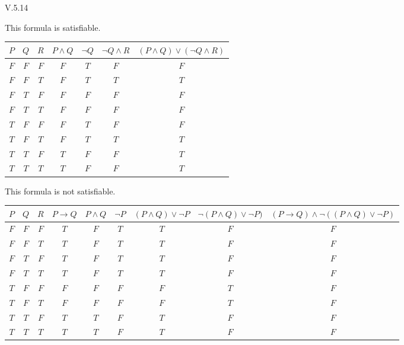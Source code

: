 \begin{ans}{V.5.14}
\begin{exparts}
\item This formula is satisfiable.
\begin{center} %
\small
\begin{tabular}{ccc|ccc|c}
  $P$  &$Q$  &$R$  &$P\wedge Q$ &$\neg Q$ &$\neg Q\wedge R$ &$(P\wedge Q)\vee(\neg Q\wedge R)$ \\ \hline
  $F$  &$F$  &$F$  &$F$ &$T$ &$F$ &$F$ \\
  $F$  &$F$  &$T$  &$F$ &$T$ &$T$ &$T$ \\
  $F$  &$T$  &$F$  &$F$ &$F$ &$F$ &$F$ \\
  $F$  &$T$  &$T$  &$F$ &$F$ &$F$ &$F$ \\[1ex]
  $T$  &$F$  &$F$  &$F$ &$T$ &$F$ &$F$ \\
  $T$  &$F$  &$T$  &$F$ &$T$ &$T$ &$T$ \\
  $T$  &$T$  &$F$  &$T$ &$F$ &$F$ &$T$ \\
  $T$  &$T$  &$T$  &$T$ &$F$ &$F$ &$T$
\end{tabular}
\end{center}
\item This formula is not satisfiable.
\begin{center} %
\small
\begin{tabular}{ccc|ccccc|c}
  $P$  &$Q$  &$R$  &$P\to Q$ &$P\wedge Q$ &$\neg P$ &$(P\wedge Q)\vee \neg P$ &$\neg(P\wedge Q)\vee \neg P)$  &$(P\to Q)\wedge \neg((P\wedge Q)\vee \neg P)$  \\ \hline
  $F$  &$F$  &$F$  &$T$ &$F$ &$T$ &$T$  &$F$  &$F$ \\
  $F$  &$F$  &$T$  &$T$ &$F$ &$T$ &$T$  &$F$  &$F$ \\
  $F$  &$T$  &$F$  &$T$ &$F$ &$T$ &$T$  &$F$  &$F$ \\
  $F$  &$T$  &$T$  &$T$ &$F$ &$T$ &$T$  &$F$  &$F$ \\[1ex]
  $T$  &$F$  &$F$  &$F$ &$F$ &$F$ &$F$  &$T$  &$F$ \\
  $T$  &$F$  &$T$  &$F$ &$F$ &$F$ &$F$  &$T$  &$F$ \\
  $T$  &$T$  &$F$  &$T$ &$T$ &$F$ &$T$  &$F$  &$F$ \\
  $T$  &$T$  &$T$  &$T$ &$T$ &$F$ &$T$  &$F$  &$F$
\end{tabular}
\end{center}
\end{exparts}
\end{ans}

